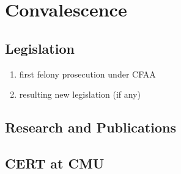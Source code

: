 \section*{Convalescence}

\subsection*{Legislation}
	\begin{enumerate}
    \item first felony prosecution under CFAA
    \item resulting new legislation (if any)
	\end{enumerate}
\subsection*{Research and Publications}
\subsection*{CERT at CMU}